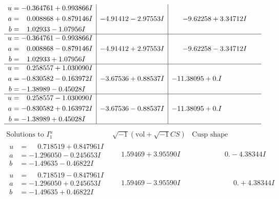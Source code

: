 \documentclass[1p]{elsarticle_modified}
\theoremstyle{definition}
\newcommand{\I}{\sqrt{-1}}
\begin{document}
$$\begin{array}{c|c|c}
\begin{aligned}
u &= -0.364761 + 0.993866 I \\
a &= \phantom{-}0.008868 + 0.879146 I \\
b &= \phantom{-}1.02933 - 1.07956 I\end{aligned}
 & -4.91412 - 2.97553 I & -9.62258 + 3.34712 I \\ \hline\begin{aligned}
u &= -0.364761 - 0.993866 I \\
a &= \phantom{-}0.008868 - 0.879146 I \\
b &= \phantom{-}1.02933 + 1.07956 I\end{aligned}
 & -4.91412 + 2.97553 I & -9.62258 - 3.34712 I \\ \hline\begin{aligned}
u &= \phantom{-}0.258557 + 1.030090 I \\
a &= -0.830582 - 0.163972 I \\
b &= -1.38989 - 0.45028 I\end{aligned}
 & -3.67536 + 0.88537 I & -11.38095 + 0. I\phantom{ +0.000000I} \\ \hline\begin{aligned}
u &= \phantom{-}0.258557 - 1.030090 I \\
a &= -0.830582 + 0.163972 I \\
b &= -1.38989 + 0.45028 I\end{aligned}
 & -3.67536 - 0.88537 I & -11.38095 + 0. I\phantom{ +0.000000I}\\
 \hline 
 \end{array}$$\newpage$$\begin{array}{c|c|c}  
\text{Solutions to }I^u_{1}& \I (\text{vol} + \sqrt{-1}CS) & \text{Cusp shape}\\
 \hline 
\begin{aligned}
u &= \phantom{-}0.718519 + 0.847961 I \\
a &= -1.296050 - 0.245653 I \\
b &= -1.49635 - 0.46822 I\end{aligned}
 & \phantom{-}1.59469 + 3.95590 I & \phantom{-0.000000 } 0. - 4.38344 I \\ \hline\begin{aligned}
u &= \phantom{-}0.718519 - 0.847961 I \\
a &= -1.296050 + 0.245653 I \\
b &= -1.49635 + 0.46822 I\end{aligned}
 & \phantom{-}1.59469 - 3.95590 I & \phantom{-0.000000 -}0. + 4.38344 I \\ \hline\begin{aligned}

\end{aligned}
\end{array}$$
\end{document}
